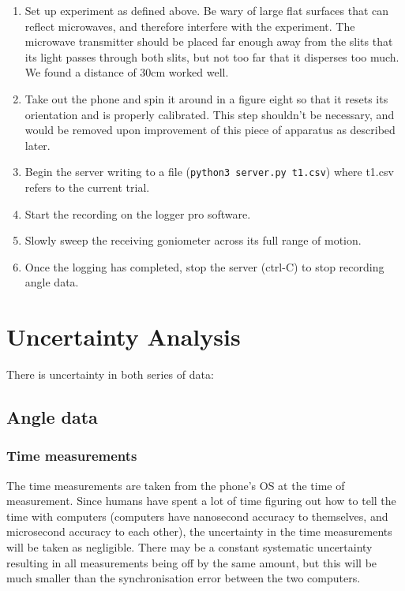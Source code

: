 \begin{enumerate}
\item Set up experiment as defined above. Be wary of large flat surfaces that can reflect microwaves, and therefore interfere with the experiment. The microwave transmitter should be placed far enough away from the slits that its light passes through both slits, but not too far that it disperses too much. We found a distance of 30cm worked well.
\item Take out the phone and spin it around in a figure eight so that it resets its orientation and is properly calibrated.
		This step shouldn't be necessary, and would be removed upon improvement of this piece of apparatus as described later.
\item Begin the server writing to a file (\verb|python3 server.py t1.csv|) where t1.csv refers to the current trial.
\item Start the recording on the logger pro software.
\item Slowly sweep the receiving goniometer across its full range of motion.
\item Once the logging has completed, stop the server (ctrl-C) to stop recording angle data.
\end{enumerate}

\section*{Uncertainty Analysis}

There is uncertainty in both series of data:

\subsection*{Angle data}

\subsubsection*{Time measurements}

The time measurements are taken from the phone's OS at the time of measurement. Since humans have spent a lot of time figuring out how to tell the time with computers (computers have nanosecond accuracy to themselves, and microsecond accuracy to each other), the uncertainty in the time measurements will be taken as negligible. There may be a constant systematic uncertainty resulting in all measurements being off by the same amount, but this will be much smaller than the synchronisation error between the two computers.


